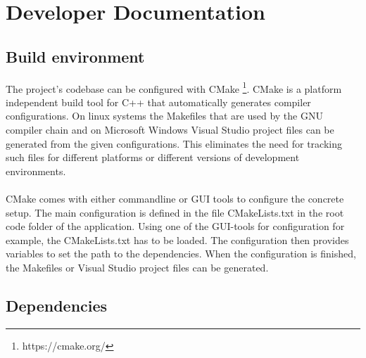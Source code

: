 \section{Developer Documentation}\label{sec:devdoc}


\subsection{Build environment}

The project’s codebase can be configured with CMake \footnote{https://cmake.org/}. CMake is a platform independent build tool for C++ that automatically generates compiler configurations. On linux systems the Makefiles that are used by the GNU compiler chain and on Microsoft Windows Visual Studio project files can be generated from the given configurations. This eliminates the need for tracking such files for different platforms or different versions of development environments.
\\
\\
CMake comes with either commandline or GUI tools to configure the concrete setup. The main configuration is defined in the file CMakeLists.txt in the root code folder of the application. Using one of the GUI-tools for configuration for example, the CMakeLists.txt has to be loaded. The configuration then provides variables to set the path to the dependencies. When the configuration is finished, the Makefiles or Visual Studio project files can be generated.


\subsection{Dependencies}


